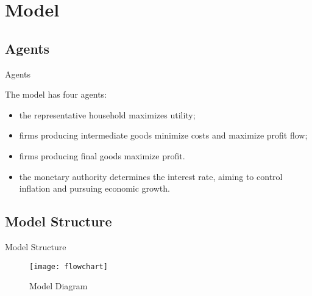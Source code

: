 \documentclass[
presentation.tex
]{subfiles}
\begin{document}
\section{Model}
	

	\subsection{Agents}
	
	\begin{frame}{Agents}

	The model has four agents:
	\begin{itemize}
	
	\item the representative household maximizes utility;
	
	\item firms producing intermediate goods minimize costs and maximize profit flow;
	
	\item firms producing final goods maximize profit.

	\item the monetary authority determines the interest rate, aiming to control inflation and pursuing economic growth.
	
	\end{itemize}		

	\end{frame}


	\subsection{Model Structure}

	\begin{frame}{Model Structure}
		
		\begin{figure}[h!]
		\centering
		\texttt{[image: flowchart]}
		\caption{Model Diagram}
		\label{fig:model-diagram}
		\end{figure}	
		
	\end{frame}

\end{document}
